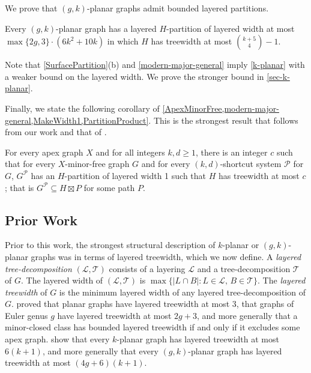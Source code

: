 \documentclass{patmorin}
\newcommand{\note}[2]{{\color{red}[#1:~#2]}}
\newcommand{\PP}{\mathcal{P}}
\renewcommand{\geq}{\geqslant}
\begin{document}
We prove that $(g,k)$-planar graphs admit bounded layered partitions. 

\begin{thm}
\label{g-k-planar}
Every $(g,k)$-planar graph has a layered $H$-partition of layered width at most 
$\max\{2g,3\}\cdot(6k^2 + 10k)$ in which $H$ has treewidth at most $\binom{k+5}{4}-1$.
\end{thm}

Note that \cref{SurfacePartition}(b) and \cref{modern-major-general} imply \cref{k-planar} with a weaker bound on the layered width. We prove the stronger bound in \cref{sec-k-planar}. 

Finally, we state the following corollary of \cref{ApexMinorFree,modern-major-general,MakeWidth1,PartitionProduct}. This is the strongest result that follows from our work and that of \citet{dujmovic.joret.ea:planar}. 

\begin{thm}
For every apex graph $X$ and for all integers $k,d\geq 1$, there is an integer $c$ such that for every $X$-minor-free graph $G$ and for every $(k,d)$-shortcut system $\PP$ for $G$,  $G^\PP$ has an $H$-partition of layered width 1 such that $H$ has treewidth at most $c$; that is $G^\PP \subseteq H \boxtimes P$ for some path $P$. 
\end{thm}

\subsection{Prior Work}
\label{PriorWork}


Prior to this work, the strongest structural description of $k$-planar or $(g,k)$-planar graphs was in terms of layered treewidth, which we now define.  A \emph{layered tree-decomposition} $(\mathcal{L},\mathcal{T})$ consists of a layering $\mathcal{L}$ and a tree-decomposition $\mathcal{T}$ of $G$. The layered width of $(\mathcal{L},\mathcal{T})$ is $\max\{|L\cap B|: L\in \mathcal{L},\, B\in \mathcal{T}\}$.  The \emph{layered treewidth} of $G$ is the minimum layered width of any layered tree-decomposition of $G$. \citet{dujmovic.morin.ea:layered} proved that planar graphs have layered treewidth at most 3, that graphs of Euler genus $g$ have layered treewidth at most $2g+3$, and more generally that a minor-closed class has bounded layered treewidth if and only if it excludes some apex graph. \citet{dujmovic.eppstein.ea:structure} show that every $k$-planar graph has layered treewidth at most $6(k+1)$, and more generally that 
every $(g,k)$-planar graph has layered treewidth at most $(4g+6)(k+1)$.
\end{document}
